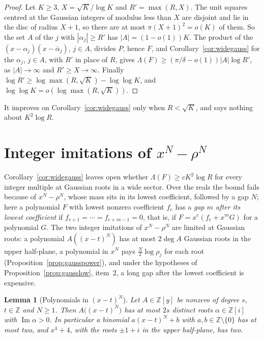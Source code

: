 \documentclass[11pt]{article}
\newtheorem{lemma}[theorem]{Lemma}
\begin{document}
\begin{proof}
Let $K\ge3$, $X=\sqrt K/\log K$ and $R'=\max(R,X)$.  The unit squares
centred at the Gaussian integers of modulus less than $X$ are disjoint and
lie in the disc of radius $X+1$, so there are at most $\pi(X+1)^2=o(K)$ of
them.  So the set $A$ of the $j$ with $|\alpha_j|\ge R'$ has
$|A|=(1-o(1))K$.  The product of the $(x-\alpha_j)(x-\bar\alpha_j)$,
$j\in A$, divides $P$, hence $F$, and Corollary~\ref{cor:widegauss} for the
$\alpha_j$, $j\in A$, with $R'$ in place of $R$, gives
$\Lambda(F)\ge(\pi/\delta-o(1))|A|\log R'$, as $|A|\to\infty$ and
$R'\ge X\to\infty$.  Finally
$\log R'\ge\log\max(R,\sqrt K)-\log\log K$, and
$\log\log K=o(\log\max(R,\sqrt K))$.
\end{proof}

It improves on Corollary~\ref{cor:widegauss} only when $R<\sqrt K$, and
says nothing about $K^2\log R$.

\section{Integer imitations of $x^N-\rho^N$}\label{sec:imitations}

Corollary~\ref{cor:widegauss}
leaves open whether $\Lambda(F)\ge cK^2\log R$ for every integer multiple at
Gaussian roots in a wide sector.  Over the reals the bound fails because of
$x^N-\rho^N$, whose mass sits in its lowest coefficient, followed by a gap
$N$; here a polynomial $F$ with lowest nonzero coefficient $f_e$ has a
\emph{gap $m$ after its lowest coefficient} if $f_{e+1}=\cdots=f_{e+m-1}=0$,
that is, if $F=x^e(f_e+x^mG)$ for a polynomial $G$.  The two integer
imitations of $x^N-\rho^N$ are limited at Gaussian roots: a
polynomial $A((x-t)^N)$ has at most $2\deg A$ Gaussian roots in the upper
half-plane, a polynomial in $x^N$ pays $\frac N2\log\rho_j$ for each root
(Proposition~\ref{prop:gausspower}), and under the hypotheses of
Proposition~\ref{prop:gausslow}, item~2, a long gap after the lowest
coefficient is expensive.

\begin{lemma}[Polynomials in $(x-t)^N$]\label{lem:gaussbinom}
Let $A\in\mathbb Z[y]$ be nonzero of degree $s$, $t\in\mathbb Z$ and $N\ge1$.
Then $A\bigl((x-t)^N\bigr)$ has at most $2s$ distinct roots $\alpha\in\mathbb Z[i]$
with $\operatorname{Im}\alpha>0$.  In particular a binomial $a(x-t)^N+b$ with
$a,b\in\mathbb Z\setminus\{0\}$ has at most two, and $x^4+4$, with the roots
$\pm1+i$ in the upper half-plane, has two.
\end{lemma}
\end{document}
